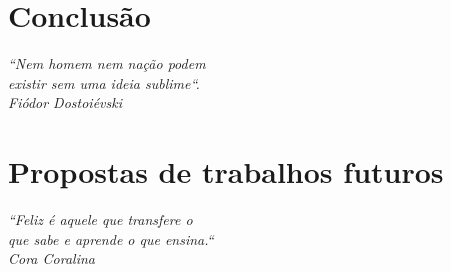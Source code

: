 \documentclass[
	11pt,
	openright,
	oneside,
	a4paper,
	english,
	french,
	spanish,
	brazil,	
	]{abntex2}
\newcommand{\quot}[1]{\begin{flushright} \textit{#1}\end{flushright}}
\begin{document}
\chapter{Conclusão}
\quot{``Nem homem nem nação podem\\existir sem uma ideia sublime``.\\Fiódor Dostoiévski}
\label{chapter:conclusao}


\chapter{Propostas de trabalhos futuros}
\quot{``Feliz é aquele que transfere o\\que sabe e aprende o que ensina.``\\Cora Coralina}
\label{chapter:trabalhos_futuros}



\postextual



\printindex
\end{document}
